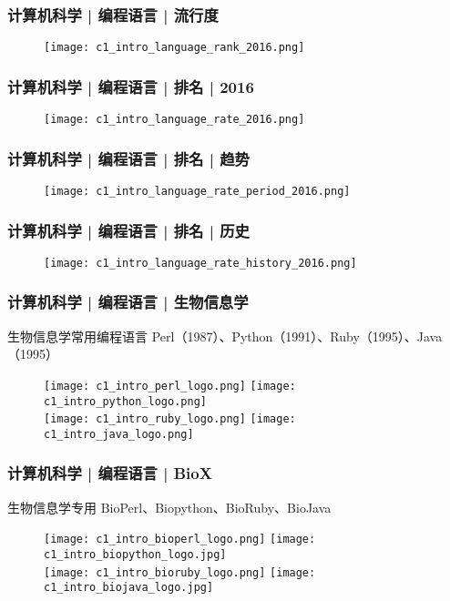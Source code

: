 \begin{frame}
  \frametitle{计算机科学 | 编程语言 | 流行度}
  \begin{figure}
    \centering
    \texttt{[image: c1\_intro\_language\_rank\_2016.png]}
  \end{figure}
\end{frame}

\begin{frame}
  \frametitle{计算机科学 | 编程语言 | 排名 | 2016}
  \begin{figure}
    \centering
    \texttt{[image: c1\_intro\_language\_rate\_2016.png]}
  \end{figure}
\end{frame}

\begin{frame}
  \frametitle{计算机科学 | 编程语言 | 排名 | 趋势}
  \begin{figure}
    \centering
    \texttt{[image: c1\_intro\_language\_rate\_period\_2016.png]}
  \end{figure}
\end{frame}

\begin{frame}
  \frametitle{计算机科学 | 编程语言 | 排名 | 历史}
  \begin{figure}
    \centering
    \texttt{[image: c1\_intro\_language\_rate\_history\_2016.png]}
  \end{figure}
\end{frame}

\begin{frame}
  \frametitle{计算机科学 | 编程语言 | 生物信息学}
  \begin{block}{\alert{生物信息学常用编程语言}}
    Perl（1987）、Python（1991）、Ruby（1995）、Java（1995）
  \end{block}
  \begin{figure}
    \centering
    \texttt{[image: c1\_intro\_perl\_logo.png]}
    \hspace{2em}
    \texttt{[image: c1\_intro\_python\_logo.png]}\\
    \texttt{[image: c1\_intro\_ruby\_logo.png]}
    \hspace{11em}
    \texttt{[image: c1\_intro\_java\_logo.png]}
  \end{figure}
\end{frame}

\begin{frame}
  \frametitle{计算机科学 | 编程语言 | BioX}
  \begin{block}{\alert{生物信息学专用}}
    BioPerl、Biopython、BioRuby、BioJava
  \end{block}
  \begin{figure}
    \centering
    \texttt{[image: c1\_intro\_bioperl\_logo.png]}
    \hspace{2em}
    \texttt{[image: c1\_intro\_biopython\_logo.jpg]}\\
    \texttt{[image: c1\_intro\_bioruby\_logo.png]}
    \hspace{10em}
    \texttt{[image: c1\_intro\_biojava\_logo.jpg]}
  \end{figure}
\end{frame}

